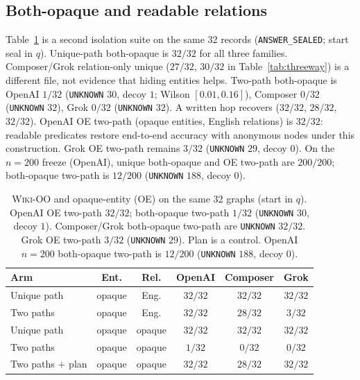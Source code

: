 \documentclass[10pt]{article} %
\begin{document}
\subsection{Both-opaque and readable relations}
\label{sec:oo}

Table~\ref{tab:entrel} is a second isolation suite on the same 32 records
(\texttt{ANSWER\_SEALED}; start seal in $q$). Unique-path both-opaque is
$32/32$ for all three families.
Composer/Grok relation-only unique ($27/32$, $30/32$ in
Table~\ref{tab:threeway}) is a different file, not evidence that hiding
entities helps. Two-path both-opaque is OpenAI $1/32$
(\texttt{UNKNOWN} $30$, decoy $1$; Wilson $[0.01,0.16]$), Composer $0/32$
(\texttt{UNKNOWN} $32$), Grok $0/32$ (\texttt{UNKNOWN} $32$). A written hop recovers
($32/32$, $28/32$, $32/32$). OpenAI OE two-path (opaque entities, English
relations) is $32/32$: readable predicates restore end-to-end accuracy with
anonymous nodes under this construction. Grok OE two-path remains $3/32$
(\texttt{UNKNOWN} $29$, decoy $0$).
On the $n{=}200$ freeze (OpenAI), unique both-opaque and OE two-path are
$200/200$; both-opaque two-path is $12/200$ (\texttt{UNKNOWN} $188$,
decoy $0$).

\begin{table}[t]
\centering
\small

\caption{\textsc{Wiki-OO} and opaque-entity (OE) on the same 32 graphs (start in $q$).
OpenAI OE two-path $32/32$; both-opaque two-path $1/32$
(\texttt{UNKNOWN} $30$, decoy $1$).
Composer/Grok both-opaque two-path are \texttt{UNKNOWN} $32/32$.
Grok OE two-path $3/32$ (\texttt{UNKNOWN} $29$). Plan is a control.
OpenAI $n{=}200$ both-opaque two-path is $12/200$ (\texttt{UNKNOWN} $188$,
decoy $0$).}
\label{tab:entrel}
\begin{tabular}{@{}lccccc@{}}
\toprule
Arm & Ent. & Rel. & OpenAI & Composer & Grok \\
\midrule
Unique path & opaque & Eng. & $32/32$ & $32/32$ & $32/32$ \\
Two paths & opaque & Eng. & $32/32$ & $28/32$ & $3/32$ \\
Unique path & opaque & opaque & $32/32$ & $32/32$ & $32/32$ \\
Two paths & opaque & opaque & $1/32$ & $0/32$ & $0/32$ \\
Two paths $+$ plan & opaque & opaque & $32/32$ & $28/32$ & $32/32$ \\
\bottomrule
\end{tabular}

\end{table}
\end{document}
